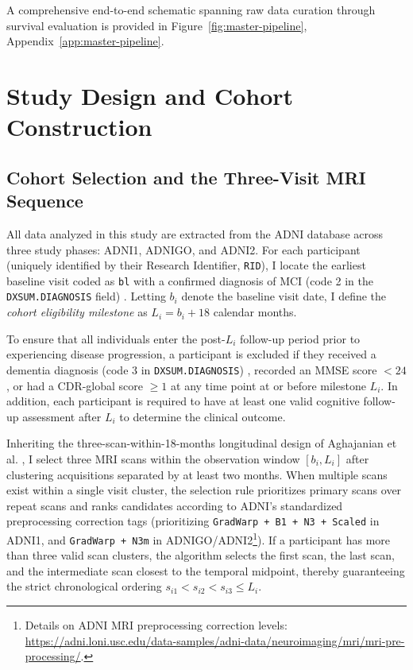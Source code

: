 A comprehensive end-to-end schematic spanning raw data curation through survival evaluation is provided in Figure~\ref{fig:master-pipeline}, Appendix~\ref{app:master-pipeline}.

\section{Study Design and Cohort Construction}
\label{sec:study-design}

\subsection{Cohort Selection and the Three-Visit MRI Sequence}
All data analyzed in this study are extracted from the ADNI database \cite{weiner2015impact,jack2008adnimri} across three study phases: ADNI1, ADNIGO, and ADNI2. For each participant (uniquely identified by their Research Identifier, \texttt{RID}), I locate the earliest baseline visit coded as \texttt{bl} with a confirmed diagnosis of MCI (code 2 in the \texttt{DXSUM.DIAGNOSIS} field) \cite{adnidxsum}. Letting $b_i$ denote the baseline visit date, I define the \emph{cohort eligibility milestone} as $L_i = b_i + 18$ calendar months.

To ensure that all individuals enter the post-$L_i$ follow-up period prior to experiencing disease progression, a participant is excluded if they received a dementia diagnosis (code 3 in \texttt{DXSUM.DIAGNOSIS}) \cite{adnidxsum}, recorded an MMSE score $<24$, or had a CDR-global score $\geq 1$ at any time point at or before milestone $L_i$. In addition, each participant is required to have at least one valid cognitive follow-up assessment after $L_i$ to determine the clinical outcome.

Inheriting the three-scan-within-18-months longitudinal design of Aghajanian et al. \cite{aghajanian2025longitudinal}, I select three MRI scans within the observation window $[b_i, L_i]$ after clustering acquisitions separated by at least two months. When multiple scans exist within a single visit cluster, the selection rule prioritizes primary scans over repeat scans and ranks candidates according to ADNI's standardized preprocessing correction tags (prioritizing \texttt{GradWarp + B1 + N3 + Scaled} in ADNI1, and \texttt{GradWarp + N3m} in ADNIGO/ADNI2\footnote{Details on ADNI MRI preprocessing correction levels: \url{https://adni.loni.usc.edu/data-samples/adni-data/neuroimaging/mri/mri-pre-processing/}.}). If a participant has more than three valid scan clusters, the algorithm selects the first scan, the last scan, and the intermediate scan closest to the temporal midpoint, thereby guaranteeing the strict chronological ordering $s_{i1} < s_{i2} < s_{i3} \leq L_i$.

